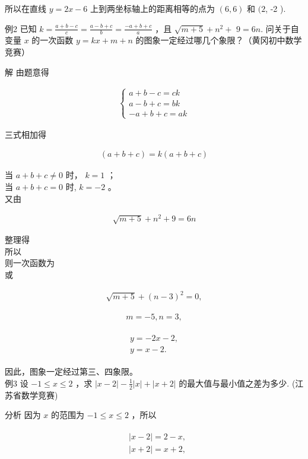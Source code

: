 \documentclass[10pt]{article}
\begin{document}
所以在直线 $y=2 x-6$ 上到两坐标轴上的距离相等的点为 $(6,6)$ 和 $(2$, -2 ).

例2 已知 $k=\frac{a+b-c}{c}=\frac{a-b+c}{b}=\frac{-a+b+c}{a}$ ，且 $\sqrt{m+5}+n^{2}+$ $9=6 n$. 问关于自变量 $x$ 的一次函数 $y=k x+m+n$ 的图象一定经过哪几个象限？（黄冈初中数学竞赛）

解 由题意得

\begin{align*}
\left\{\begin{array}{l}
a+b-c=c k \\
a-b+c=b k \\
-a+b+c=a k
\end{array}\right.
\end{align*}

三式相加得

\begin{align*}
(a+b+c)=k(a+b+c)
\end{align*}

当 $a+b+c \neq 0$ 时， $k=1$ ；\\
当 $a+b+c=0$ 时, $k=-2$ 。\\
又由

\begin{align*}
\sqrt{m+5}+n^{2}+9=6 n
\end{align*}

整理得\\
所以\\
则一次函数为\\
或

\begin{align*}
\sqrt{m+5}+(n-3)^{2}=0,
\end{align*}

\begin{align*}
m=-5, n=3,
\end{align*}

\begin{align*}
\begin{gathered}
y=-2 x-2, \\
y=x-2 .
\end{gathered}
\end{align*}

因此，图象一定经过第三、四象限。\\
例3 设 $-1 \leqslant x \leqslant 2$ ，求 $|x-2|-\frac{1}{2}|x|+|x+2|$ 的最大值与最小值之差为多少. (江苏省数学竞赛)

分析 因为 $x$ 的范围为 $-1 \leqslant x \leqslant 2$ ，所以

\begin{align*}
\begin{aligned}
& |x-2|=2-x, \\
& |x+2|=x+2,
\end{aligned}
\end{align*}
\end{document}
